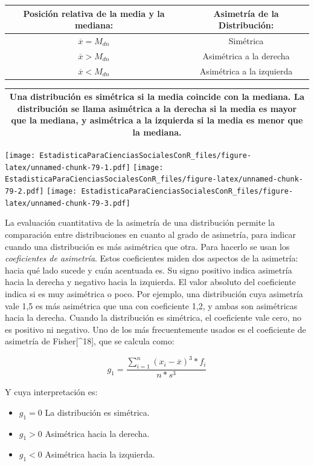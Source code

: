 \documentclass[]{book}
\begin{document}
\begin{longtable}[]{@{}cc@{}}
\toprule
Posición relativa de la media y la mediana: & Asimetría de la Distribución:\tabularnewline
\midrule
\endhead
\(\overline{x} = M_{dn}\) & Simétrica\tabularnewline
\(\overline{x} > M_{dn}\) & Asimétrica a la derecha\tabularnewline
\(\overline{x} < M_{dn}\) & Asimétrica a la izquierda\tabularnewline
\bottomrule
\end{longtable}

\begin{longtable}[]{@{}c@{}}
\toprule
\endhead
\begin{minipage}[t]{0.97\columnwidth}\centering
Una distribución es \textbf{simétrica} si la media coincide con la mediana. La distribución se llama asimétrica a la derecha si la media es mayor que la mediana, y asimétrica a la izquierda si la media es menor que la mediana.\strut
\end{minipage}\tabularnewline
\bottomrule
\end{longtable}

\texttt{[image: EstadisticaParaCienciasSocialesConR\_files/figure-latex/unnamed-chunk-79-1.pdf]} \texttt{[image: EstadisticaParaCienciasSocialesConR\_files/figure-latex/unnamed-chunk-79-2.pdf]} \texttt{[image: EstadisticaParaCienciasSocialesConR\_files/figure-latex/unnamed-chunk-79-3.pdf]}

La evaluación cuantitativa de la asimetría de una distribución permite la comparación entre distribuciones en cuanto al grado de asimetría, para indicar cuando una distribución es más asimétrica que otra. Para hacerlo se usan los \emph{coeficientes de asimetría}. Estos coeficientes miden dos aspectos
de la asimetría: hacia qué lado sucede y cuán acentuada es. Su signo
positivo indica asimetría hacia la derecha y negativo hacia la
izquierda. El valor absoluto del coeficiente indica si es muy asimétrica
o poco. Por ejemplo, una distribución cuya asimetría vale 1,5 es más
asimétrica que una con coeficiente 1,2, y ambas son asimétricas hacia la
derecha. Cuando la distribución es simétrica, el coeficiente vale cero,
no es positivo ni negativo. Uno de los más frecuentemente usados es el
coeficiente de asimetría de Fisher{[}\^{}18{]}, que se calcula como:

\[g_{1} = \frac{\sum_{i = 1}^{n}{\left( x_{i} - \overline{x} \right)^{3}*f_{i}}}{n*s^{3}}\]

Y cuya interpretación es:

\begin{itemize}
\item
  \(g_{1} = 0\) La distribución es simétrica.
\item
  \(g_{1} > 0\) Asimétrica hacia la derecha.
\item
  \(g_{1} < 0\) Asimétrica hacia la izquierda.
\end{itemize}
\end{document}
